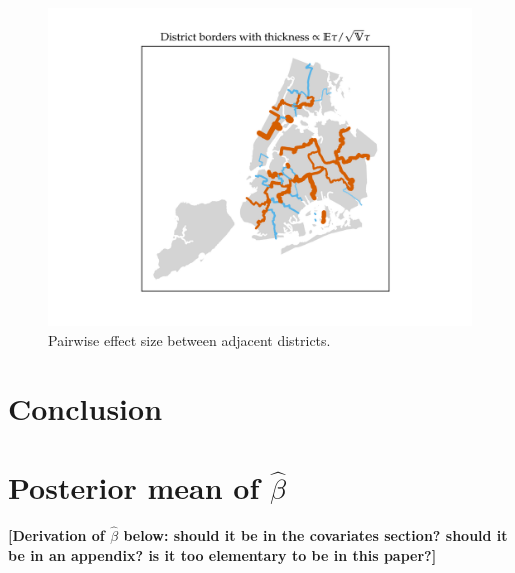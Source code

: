 \documentclass[letter]{article}
\makeatletter
\def\maxwidth{\ifdim\Gin@nat@width>\linewidth\linewidth
\else\Gin@nat@width\fi}
\let\Oldincludegraphics\includegraphics
\renewcommand{\includegraphics}[1]{\Oldincludegraphics[width=.8\maxwidth]{#1}}
\makeatother
\begin{document}
\begin{figure}
\centering
\includegraphics{NYC/NYC_plots/pairwise_multi.png}
\caption{Pairwise effect size between adjacent districts.}
\end{figure}
    


    	\section{Conclusion}\label{conclusion}
    


    	\appendix
    


    	\section{\texorpdfstring{Posterior mean of \(\hat\beta\)}{Posterior mean of \textbackslash{}hat\textbackslash{}beta}}\label{posterior-mean-of-hatbeta}

\textbf{{[}Derivation of \(\hat{\beta}\) below: should it be in the covariates section? should it be in an appendix? is it too elementary to be in this paper?{]}}
\end{document}

